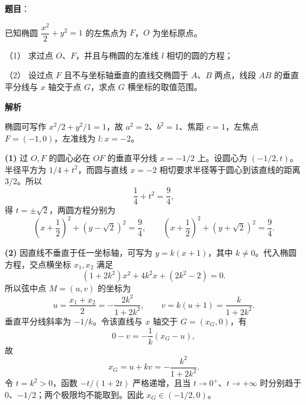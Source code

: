 \begin{answer}

\textbf{题目}：

已知椭圆 $\dfrac{x^2}{2}+y^2=1$ 的左焦点为 $F$，$O$ 为坐标原点。

（1） 求过点 $O$、$F$，并且与椭圆的左准线 $l$ 相切的圆的方程；

（2） 设过点 $F$ 且不与坐标轴垂直的直线交椭圆于 $A$、$B$ 两点，线段 $AB$ 的垂直平分线与 $x$ 轴交于点 $G$，求点 $G$ 横坐标的取值范围。
\nopagebreak[4]
\begin{center}\end{center}
\nopagebreak[4]
\textbf{解析}

椭圆可写作 $x^2/2+y^2/1=1$，故 $a^2=2$、$b^2=1$、焦距 $c=1$，左焦点 $F=(-1,0)$，左准线为 $l:x=-2$。

\textbf{(1)} 过 $O,F$ 的圆心必在 $OF$ 的垂直平分线 $x=-1/2$ 上。设圆心为 $(-1/2,t)$。半径平方为 $1/4+t^2$，而圆与直线 $x=-2$ 相切要求半径等于圆心到该直线的距离 $3/2$。所以
\nopagebreak[4]
\[
\frac14+t^2=\frac94,
\]
得 $t=\pm\sqrt2$，两圆方程分别为
\nopagebreak[4]
\[
\left(x+\frac12\right)^2+(y-\sqrt2)^2=\frac94,
\qquad
\left(x+\frac12\right)^2+(y+\sqrt2)^2=\frac94.
\]

\textbf{(2)} 因直线不垂直于任一坐标轴，可写为 $y=k(x+1)$，其中 $k\ne0$。代入椭圆方程，交点横坐标 $x_1,x_2$ 满足
\nopagebreak[4]
\[
(1+2k^2)x^2+4k^2x+(2k^2-2)=0.
\]
所以弦中点 $M=(u,v)$ 的坐标为
\nopagebreak[4]
\[
u=\frac{x_1+x_2}{2}=-\frac{2k^2}{1+2k^2},\qquad
v=k(u+1)=\frac{k}{1+2k^2}.
\]
垂直平分线斜率为 $-1/k$。令该直线与 $x$ 轴交于 $G=(x_G,0)$，有
\nopagebreak[4]
\[
0-v=-\frac1k(x_G-u),
\]
故
\nopagebreak[4]
\[
x_G=u+kv=-\frac{k^2}{1+2k^2}.
\]
令 $t=k^2>0$，函数 $-t/(1+2t)$ 严格递增，且当 $t\to0^+$、$t\to+\infty$ 时分别趋于 $0$、$-1/2$；两个极限均不能取到。因此 $x_G\in(-1/2,0)$。
\nopagebreak[4]
\begin{center}\end{center}
\nopagebreak[4]


\end{answer}
